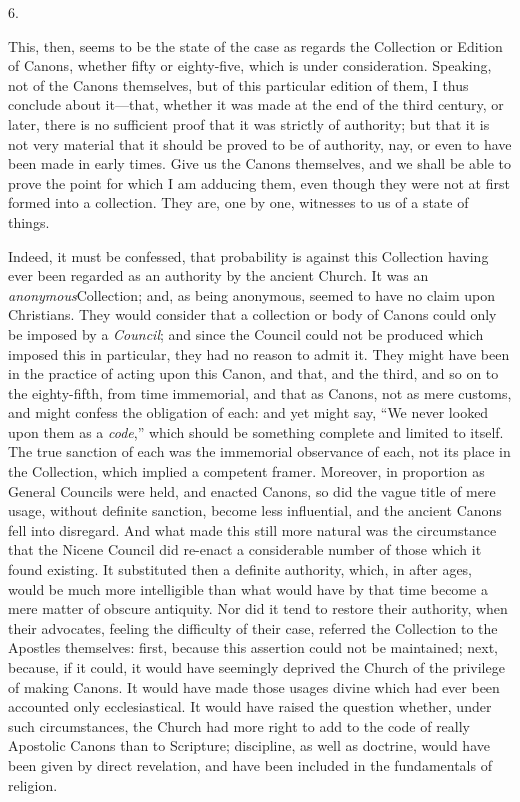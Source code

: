 6.

This, then, seems to be the state of the case as regards the
Collection or Edition of Canons, whether fifty or eighty-five, which
is under consideration. Speaking, not of the Canons themselves, but of
this particular edition of them, I thus conclude about it—that,
whether it was made at the end of the third century, or later, there
is no sufficient proof that it was strictly of authority; but that it
is not very material that it should be proved to be of authority, nay,
or even to have been made in early times. Give us the Canons
themselves, and we shall be able to prove the point for which I am
adducing them, even though they were not at first formed into a
collection. They are, one by one, witnesses to us of a state of
things.

Indeed, it must be confessed, that probability is against this
Collection having ever been regarded as an authority by the ancient
Church. It was an \emph{anonymous}Collection; and, as being
anonymous, seemed to have no claim upon Christians. They would
consider that a collection or body of Canons could only be imposed by
a \emph{Council}; and since the Council could not be produced which
imposed this in particular, they had no reason to admit it. They might
have been in the practice of acting upon this Canon, and that, and the
third, and so on to the eighty-fifth, from time immemorial, and that
as Canons, not as mere customs, and might confess the obligation
of each: and yet might say, ``We never looked upon them as a \emph{code},''
which should be something complete and limited to itself. The true
sanction of each was the immemorial observance of each, not its place
in the Collection, which implied a competent framer. Moreover, in
proportion as General Councils were held, and enacted Canons, so did
the vague title of mere usage, without definite sanction, become less
influential, and the ancient Canons fell into disregard. And what made
this still more natural was the circumstance that the Nicene Council
did re-enact a considerable number of those which it found existing.
It substituted then a definite authority, which, in after ages, would
be much more intelligible than what would have by that time become a
mere matter of obscure antiquity. Nor did it tend to restore their
authority, when their advocates, feeling the difficulty of their case,
referred the Collection to the Apostles themselves: first, because
this assertion could not be maintained; next, because, if it could, it
would have seemingly deprived the Church of the privilege of making
Canons. It would have made those usages divine which had ever been
accounted only ecclesiastical. It would have raised the question
whether, under such circumstances, the Church had more right to add to
the code of really Apostolic Canons than to Scripture; discipline, as
well as doctrine, would have been given by direct revelation, and have
been included in the fundamentals of religion.

